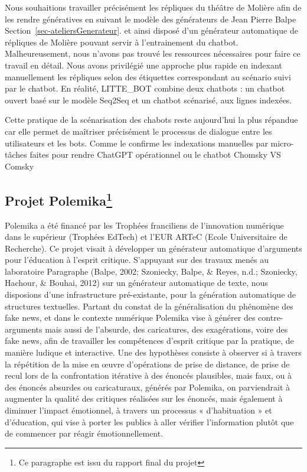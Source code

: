 \documentclass[
  a4paper,
  DIV=11,
  numbers=noendperiod]{scrreprt}
\begin{document}
Nous souhaitions travailler précisément les répliques du théâtre de
Molière afin de les rendre génératives en suivant le modèle des
générateurs de Jean Pierre Balpe Section~\ref{sec-ateliersGenerateur}.
et ainsi disposé d'un générateur automatique de répliques de Molière
pouvant servir à l'entrainement du chatbot. Malheureusement, nous
n'avons pas trouvé les ressources nécessaires pour faire ce travail en
détail. Nous avons privilégié une approche plus rapide en indexant
manuellement les répliques selon des étiquettes correspondant au
scénario suivi par le chatbot. En réalité, LITTE\_BOT combine deux
chatbots : un chatbot ouvert basé sur le modèle Seq2Seq et un chatbot
scénarisé, aux lignes indexées.

Cette pratique de la scénarisation des chabots reste aujourd'hui la plus
répandue car elle permet de maîtriser précisément le processus de
dialogue entre les utilisateurs et les bots. Comme le confirme les
indexations manuelles par micro-tâches faites pour rendre ChatGPT
opérationnel ou le chatbot Chomsky VS Comsky

\subsection[Projet Polemika]{\texorpdfstring{Projet
Polemika\footnote{Ce paragraphe est issu du rapport final du projet}}{Projet Polemika}}\label{projet-polemikapositionnements-6}

Polemika a été financé par les Trophées franciliens de l'innovation
numérique dans le supérieur (Trophées EdTech) et l'EUR ARTeC (Ecole
Universitaire de Recherche). Ce projet visait à développer un générateur
automatique d'arguments pour l'éducation à l'esprit critique. S'appuyant
sur des travaux menés au laboratoire Paragraphe (Balpe, 2002; Szoniecky,
Balpe, \& Reyes, n.d.; Szoniecky, Hachour, \& Bouhai, 2012) sur un
générateur automatique de texte, nous disposions d'une infrastructure
pré-existante, pour la génération automatique de structures textuelles.
Partant du constat de la généralisation du phénomène des fake news, et
dans le contexte numérique Polemika vise à générer des contre-arguments
mais aussi de l'absurde, des caricatures, des exagérations, voire des
fake news, afin de travailler les compétences d'esprit critique par la
pratique, de manière ludique et interactive. Une des hypothèses consiste
à observer si à travers la répétition de la mise en œuvre d'opérations
de prise de distance, de prise de recul lors de la confrontation
itérative à des énoncés plausibles, mais faux, ou à des énoncés absurdes
ou caricaturaux, générés par Polemika, on parviendrait à augmenter la
qualité des critiques réalisées sur les énoncés, mais également à
diminuer l'impact émotionnel, à travers un processus « d'habituation »
et d'éducation, qui vise à porter les publics à aller vérifier
l'information plutôt que de commencer par réagir émotionnellement.
\end{document}
